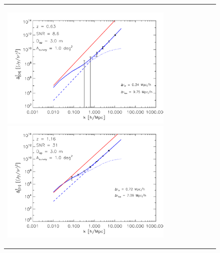 \begin{figure}[h]
  \begin{tabular}{ll}%
    \begin{minipage}{3.25in}%
      \begin{center} %
	\includegraphics[width=3.25in]{pcii_z63.pdf}
	\includegraphics[width=3.25in]{pcii_z116.pdf}
      \end{center}
    \end{minipage} &
    

\end{tabular}
\end{figure}
